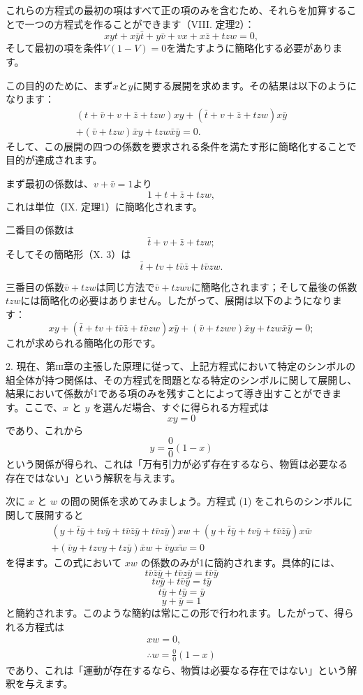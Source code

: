 \documentclass[a4paper,11pt,openany]{ltjsbook}
\begin{document}
これらの方程式の最初の項はすべて正の項のみを含むため、それらを加算することで一つの方程式を作ることができます（VIII. 定理2）：
\[
xyt + x\bar{y}\bar{t} + y\bar{v} + vx + x\bar{z} + tzw = 0,
\]
そして最初の項を条件$V(1-V) = 0$を満たすように簡略化する必要があります。

この目的のために、まず$x$と$y$に関する展開を求めます。その結果は以下のようになります：
\[
\begin{split}
  (t + \bar{v} + v + \bar{z} + tzw) xy
   + (\bar{t} + v + \bar{z} + tzw) x\bar{y}   \\
   + (\bar{v} + tzw) \bar{x}y + tzw\bar{x}\bar{y} = 0.
\end{split}
\]
そして、この展開の四つの係数を要求される条件を満たす形に簡略化することで目的が達成されます。

まず最初の係数は、$v + \bar{v} = 1$より
\[
1 + t + \bar{z} + tzw,
\]
これは単位（IX. 定理1）に簡略化されます。

二番目の係数は
\[
  \bar{t} + v + \bar{z} + tzw;
\]
そしてその簡略形（X. 3）は
\[
  \bar{t} + tv + t\bar{v}\bar{z} + t\bar{v}zw.
\]

三番目の係数$\bar{v} + tzw$は同じ方法で$\bar{v} + tzwv$に簡略化されます；そして最後の係数$tzw$には簡略化の必要はありません。したがって、展開は以下のようになります：
\[
  xy
+ \left(\bar{t} + tv  + t\bar{v}\bar{z} + t\bar{v}zw\right)x\bar{y}
+ \left(\bar{v}  + tzwv\right) \bar{x}y
+ tzw\bar{x}\bar{y} = 0; \tag{1}
\]
これが求められる簡略化の形です。

2. 現在、第\textsc{iii}章の主張した原理に従って、上記方程式において特定のシンボルの組全体が持つ関係は、その方程式を問題となる特定のシンボルに関して展開し、結果において係数が1である項のみを残すことによって導き出すことができます。ここで、$x$ と $y$ を選んだ場合、すぐに得られる方程式は
\[
xy = 0
\]
であり、これから
\[
y = \frac{0}{0}(1 - x)
\]
という関係が得られ、これは「万有引力が必ず存在するなら、物質は必要なる存在ではない」という解釈を与えます。

次に $x$ と $w$ の間の関係を求めてみましょう。方程式 (1) をこれらのシンボルに関して展開すると
\begin{multline*}
  \left(y + \bar{t}\bar{y} + tv\bar{y} + t\bar{v}\bar{z}\bar{y}
      + t\bar{v}z\bar{y}\right)xw
+ \left(y + \bar{t}\bar{y} + tv\bar{y}
      + t\bar{v}\bar{z}\bar{y}\right)x\bar{w}
\\
+ \left(\bar{v}y + tzvy + tz\bar{y}\right)\bar{x}w
+ \bar{v}y\bar{xw} = 0
\end{multline*}
を得ます。この式において $xw$ の係数のみが1に簡約されます。具体的には、
\[
t\bar{v}\bar{z}\bar{y} + t\bar{v}z\bar{y} = t\bar{v}\bar{y}
\]
\[
tv\bar{y} + t\bar{v}\bar{y} = t\bar{y}
\]
\[
\bar{t}\bar{y} + t\bar{y} = \bar{y}
\]
\[
y + \bar{y} = 1
\]
と簡約されます。このような簡約は常にこの形で行われます。したがって、得られる方程式は
\begin{gather*}
xw = 0, \\
\therefore w = \frac{0}{0}(1 - x)
\end{gather*}
であり、これは「運動が存在するなら、物質は必要なる存在ではない」という解釈を与えます。
\end{document}
